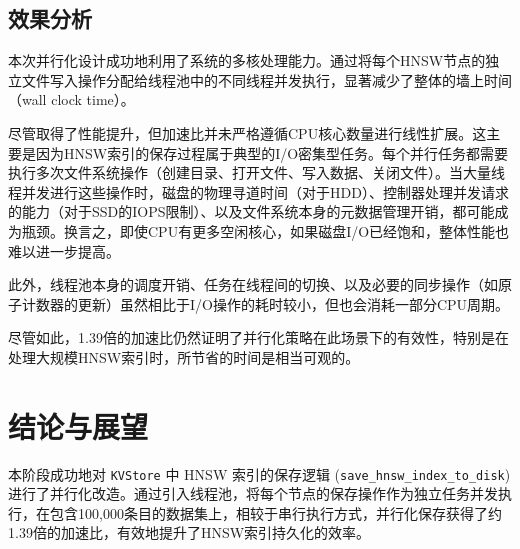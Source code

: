 \documentclass{ctexart} %
\begin{document}
\subsection{效果分析}
本次并行化设计成功地利用了系统的多核处理能力。通过将每个HNSW节点的独立文件写入操作分配给线程池中的不同线程并发执行，显著减少了整体的墙上时间（wall clock time）。

尽管取得了性能提升，但加速比并未严格遵循CPU核心数量进行线性扩展。这主要是因为HNSW索引的保存过程属于典型的I/O密集型任务。每个并行任务都需要执行多次文件系统操作（创建目录、打开文件、写入数据、关闭文件）。当大量线程并发进行这些操作时，磁盘的物理寻道时间（对于HDD）、控制器处理并发请求的能力（对于SSD的IOPS限制）、以及文件系统本身的元数据管理开销，都可能成为瓶颈。换言之，即使CPU有更多空闲核心，如果磁盘I/O已经饱和，整体性能也难以进一步提高。

此外，线程池本身的调度开销、任务在线程间的切换、以及必要的同步操作（如原子计数器的更新）虽然相比于I/O操作的耗时较小，但也会消耗一部分CPU周期。

尽管如此，1.39倍的加速比仍然证明了并行化策略在此场景下的有效性，特别是在处理大规模HNSW索引时，所节省的时间是相当可观的。

\section{结论与展望}
本阶段成功地对 \texttt{KVStore} 中 HNSW 索引的保存逻辑 (\texttt{save_hnsw_index_to_disk}) 进行了并行化改造。通过引入线程池，将每个节点的保存操作作为独立任务并发执行，在包含100,000条目的数据集上，相较于串行执行方式，并行化保存获得了约1.39倍的加速比，有效地提升了HNSW索引持久化的效率。
\end{document}
